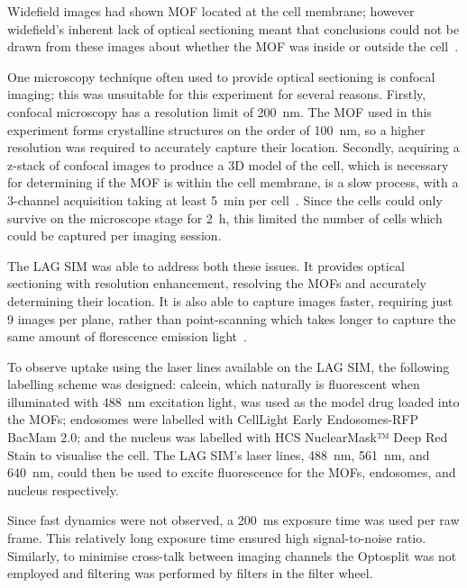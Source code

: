 Widefield images had shown MOF located at the cell membrane; however widefield's inherent lack of optical sectioning meant that conclusions could not be drawn from these images about whether the MOF was inside or outside the cell~\cite{orellana2015amorphous}.

One microscopy technique often used to provide optical sectioning is confocal imaging; this was unsuitable for this experiment for several reasons.
Firstly, confocal microscopy has a resolution limit of \SI{200}{\nano\metre}.
The MOF used in this experiment forms crystalline structures on the order of \SI{100}{\nano\metre}, so a higher resolution was required to accurately capture their location.
Secondly, acquiring a z-stack of confocal images to produce a 3D model of the cell, which is necessary for determining if the MOF is within the cell membrane, is a slow process, with a 3-channel acquisition taking at least \SI{5}{\minute} per cell~\cite{jonkman2015any}.
Since the cells could only survive on the microscope stage for \SI{2}{\hour}, this limited the number of cells which could be captured per imaging session.

The LAG SIM was able to address both these issues.
It provides optical sectioning with resolution enhancement, resolving the MOFs and accurately determining their location.
It is also able to capture images faster, requiring just 9 images per plane, rather than point-scanning which takes longer to capture the same amount of florescence emission light~\cite{jonkman2015any}.

To observe uptake using the laser lines available on the LAG SIM, the following labelling scheme was designed:
calcein, which naturally is fluorescent when illuminated with \SI{488}{\nano\metre} excitation light, was used as the model drug loaded into the MOFs;
endosomes were labelled with CellLight Early Endosomes-RFP BacMam 2.0; and the nucleus was labelled with HCS NuclearMask™ Deep Red Stain to visualise the cell.
The LAG SIM's laser lines, \SI{488}{\nano\metre}, \SI{561}{\nano\metre}, and \SI{640}{\nano\metre}, could then be used to excite fluorescence for the MOFs, endosomes, and nucleus respectively.

Since fast dynamics were not observed, a \SI{200}{\milli\second} exposure time was used per raw frame.
This relatively long exposure time ensured high signal-to-noise ratio.
Similarly, to minimise cross-talk between imaging channels the Optosplit was not employed and filtering was performed by filters in the filter wheel.

